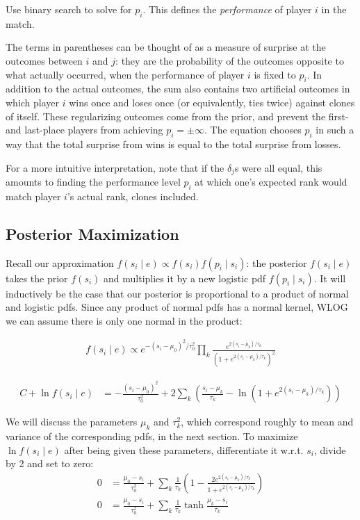 \documentclass{article}
\begin{document}
Use binary search to solve for $p_i$. This defines the \emph{performance} of player $i$ in the match.

The terms in parentheses can be thought of as a measure of surprise at the outcomes between $i$ and $j$: they are the probability of the outcomes opposite to what actually occurred, when the performance of player $i$ is fixed to $p_i$. In addition to the actual outcomes, the sum also contains two artificial outcomes in which player $i$ wins once and loses once (or equivalently, ties twice) against clones of itself. These regularizing outcomes come from the prior, and prevent the first- and last-place players from achieving $p_i = \pm\infty$. The equation chooses $p_i$ in such a way that the total surprise from wins is equal to the total surprise from losses.

For a more intuitive interpretation, note that if the $\delta_j$s were all equal, this amounts to finding the performance level $p_i$ at which one's expected rank would match player $i$'s actual rank, clones included.

\subsection{Posterior Maximization}

Recall our approximation $f(s_i\mid e) \propto f(s_i)f(p_i\mid s_i)$: the posterior $f(s_i \mid e)$ takes the prior $f(s_i)$ and multiplies it by a new logistic pdf $f(p_i\mid s_i)$. It will inductively be the case that our posterior is proportional to a product of normal and logistic pdfs. Since any product of normal pdfs has a normal kernel, WLOG we can assume there is only one normal in the product:

\begin{align}
f(s_i\mid e) \propto e^{-(s_i-\mu_0)^2/\tau_0^2} \prod_k \frac { e^{2(s_i-\mu_k)/\tau_k} } { \left(1 + e^{2(s_i-\mu_k)/\tau_k} \right)^2 }
\end{align}

\begin{align}
C + \ln f(s_i \mid e) &= -\frac{(s_i-\mu_0)^2}{\tau_0^2} + 2\sum_k \left( \frac{s_i-\mu_k}{\tau_k} - \ln(1 + e^{2(s_i-\mu_k)/\tau_k}) \right)
\end{align}

We will discuss the parameters $\mu_k$ and $\tau_k^2$, which correspond roughly to mean and variance of the corresponding pdfs, in the next section. To maximize $\ln f(s_i \mid e)$ after being given these parameters, differentiate it w.r.t. $s_i$, divide by 2 and set to zero:
\begin{align}
0 &= \frac{\mu_0-s_i}{\tau_0^2} + \sum_k \frac{1}{\tau_k}\left( 1 - \frac {2e^{2(s_i-\mu_k)/\tau_k}} {1 + e^{2(s_i-\mu_k)/\tau_k}} \right)
\\0 &=  \frac{\mu_0-s_i}{\tau_0^2} + \sum_k \frac{1}{\tau_k} \tanh \frac {\mu_k-s_i} {\tau_k}
\end{align}
\end{document}
